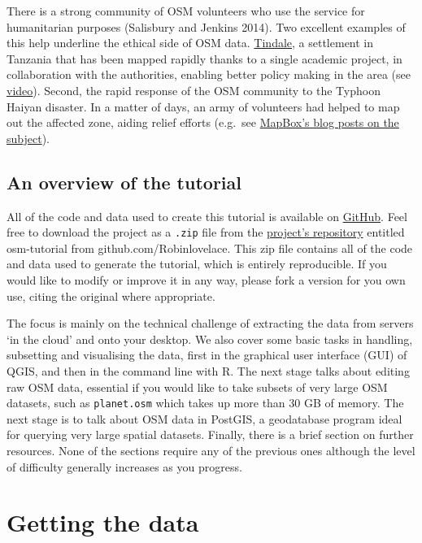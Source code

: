 \documentclass[]{article}
\begin{document}
There is a strong community of OSM volunteers who use the service for
humanitarian purposes (Salisbury and Jenkins 2014). Two excellent
examples of this help underline the ethical side of OSM data.
\href{http://explore.ramanitanzania.org/}{Tindale}, a settlement in
Tanzania that has been mapped rapidly thanks to a single academic
project, in collaboration with the authorities, enabling better policy
making in the area (see
\href{http://www.youtube.com/watch?v=KqrGyvNnWkA}{video}). Second, the
rapid response of the OSM community to the Typhoon Haiyan disaster. In a
matter of days, an army of volunteers had helped to map out the affected
zone, aiding relief efforts (e.g.~see
\href{https://www.mapbox.com/blog/typhoon-haiyan-openstreetmap/}{MapBox's
blog posts on the subject}).

\subsection{An overview of the
tutorial}\label{an-overview-of-the-tutorial}

All of the code and data used to create this tutorial is available on
\href{http://github.com}{GitHub}. Feel free to download the project as a
\texttt{.zip} file from the
\href{https://github.com/Robinlovelace/osm-tutorial}{project's
repository} entitled osm-tutorial from github.com/Robinlovelace. This
zip file contains all of the code and data used to generate the
tutorial, which is entirely reproducible. If you would like to modify or
improve it in any way, please fork a version for you own use, citing the
original where appropriate.

The focus is mainly on the technical challenge of extracting the data
from servers `in the cloud' and onto your desktop. We also cover some
basic tasks in handling, subsetting and visualising the data, first in
the graphical user interface (GUI) of QGIS, and then in the command line
with R. The next stage talks about editing raw OSM data, essential if
you would like to take subsets of very large OSM datasets, such as
\texttt{planet.osm} which takes up more than 30 GB of memory. The next
stage is to talk about OSM data in PostGIS, a geodatabase program ideal
for querying very large spatial datasets. Finally, there is a brief
section on further resources. None of the sections require any of the
previous ones although the level of difficulty generally increases as
you progress.

\section{Getting the data}\label{getting-the-data}
\end{document}
